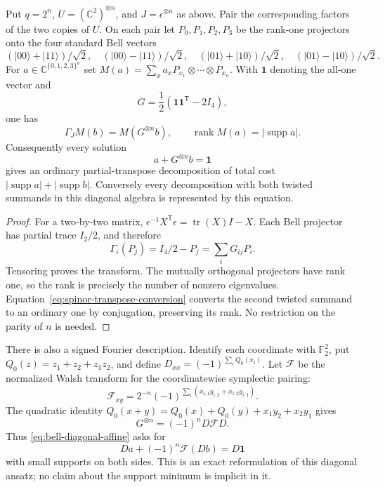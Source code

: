 \begin{proposition}
\label{prop:bell-diagonal-pt}
Put $q=2^n$, $U=(\mathbb C^2)^{\otimes n}$, and
$J=\epsilon^{\otimes n}$ as above. Pair the corresponding factors
of the two copies of $U$. On each pair let $P_0,P_1,P_2,P_3$ be
the rank-one projectors onto the four standard Bell vectors
\[
 (|00\rangle+|11\rangle)/\sqrt2,\quad
 (|00\rangle-|11\rangle)/\sqrt2,\quad
 (|01\rangle+|10\rangle)/\sqrt2,\quad
 (|01\rangle-|10\rangle)/\sqrt2.
\]
For $a\in\mathbb C^{\{0,1,2,3\}^n}$ set
$M(a)=\sum_xa_xP_{x_1}\otimes\cdots\otimes P_{x_n}$.
With $\mathbf1$ denoting the all-one vector and
\[
 G=\frac12(\mathbf1\mathbf1^{\mathsf T}-2I_4),
\]
one has
\[
 \Gamma_J M(b)=M(G^{\otimes n}b),\qquad
 \operatorname{rank}M(a)=|\operatorname{supp}a|.
\]
Consequently every solution
\begin{equation}\label{eq:bell-diagonal-affine}
 a+G^{\otimes n}b=\mathbf1
\end{equation}
gives an ordinary partial-transpose decomposition of total cost
$|\operatorname{supp}a|+|\operatorname{supp}b|$.
Conversely every decomposition with both twisted summands in this
diagonal algebra is represented by this equation.
\end{proposition}
\begin{proof}
For a two-by-two matrix,
$\epsilon^{-1}X^{\mathsf T}\epsilon=\operatorname{tr}(X)I-X$.
Each Bell projector has partial trace $I_2/2$, and therefore
\[
 \Gamma_\epsilon(P_j)=I_4/2-P_j
       =\sum_iG_{ij}P_i.
\]
Tensoring proves the transform. The mutually orthogonal projectors
have rank one, so the rank is precisely the number of nonzero
eigenvalues. Equation~\eqref{eq:spinor-transpose-conversion}
converts the second twisted summand to an ordinary one by
conjugation, preserving its rank. No restriction on the parity of
$n$ is needed.
\end{proof}

There is also a signed Fourier description. Identify each coordinate
with $\mathbb F_2^2$, put
$Q_0(z)=z_1+z_2+z_1z_2$, and define
$D_{xx}=(-1)^{\sum_iQ_0(x_i)}$.
Let $\mathcal F$ be the normalized Walsh transform for the
coordinatewise symplectic pairing:
\[
 \mathcal F_{xy}=2^{-n}
 (-1)^{\sum_i(x_{i,1}y_{i,2}+x_{i,2}y_{i,1})}.
\]
The quadratic identity
$Q_0(x+y)=Q_0(x)+Q_0(y)+x_1y_2+x_2y_1$
gives
\[
 G^{\otimes n}=(-1)^nD\mathcal F D.
\]
Thus \eqref{eq:bell-diagonal-affine} asks for
\[
 Da+(-1)^n\mathcal F(Db)=D\mathbf1
\]
with small supports on both sides. This is an exact reformulation
of this diagonal ansatz; no claim about the support minimum is
implicit in it.

